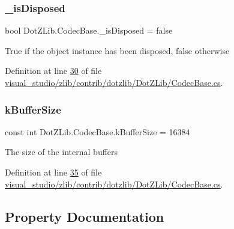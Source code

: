 \subsubsection{\texorpdfstring{\+\_\+is\+Disposed}{\_isDisposed}}
{\footnotesize\ttfamily bool Dot\+Z\+Lib.\+Codec\+Base.\+\_\+is\+Disposed = false\hspace{0.3cm}{\ttfamily [protected]}}



True if the object instance has been disposed, false otherwise 



Definition at line \hyperlink{visual__studio_2zlib_2contrib_2dotzlib_2_dot_z_lib_2_codec_base_8cs_source_l00030}{30} of file \hyperlink{visual__studio_2zlib_2contrib_2dotzlib_2_dot_z_lib_2_codec_base_8cs_source}{visual\+\_\+studio/zlib/contrib/dotzlib/\+Dot\+Z\+Lib/\+Codec\+Base.\+cs}.

\mbox{\label{class_dot_z_lib_1_1_codec_base_a4e516f01a0660be7dbbbed22d1f6b595}} 
\subsubsection{\texorpdfstring{k\+Buffer\+Size}{kBufferSize}}
{\footnotesize\ttfamily const int Dot\+Z\+Lib.\+Codec\+Base.\+k\+Buffer\+Size = 16384\hspace{0.3cm}{\ttfamily [protected]}}



The size of the internal buffers 



Definition at line \hyperlink{visual__studio_2zlib_2contrib_2dotzlib_2_dot_z_lib_2_codec_base_8cs_source_l00035}{35} of file \hyperlink{visual__studio_2zlib_2contrib_2dotzlib_2_dot_z_lib_2_codec_base_8cs_source}{visual\+\_\+studio/zlib/contrib/dotzlib/\+Dot\+Z\+Lib/\+Codec\+Base.\+cs}.



\subsection{Property Documentation}
\mbox{\label{class_dot_z_lib_1_1_codec_base_a3d3d33386fbbfcdc84c5f566a1d302cc}} 
